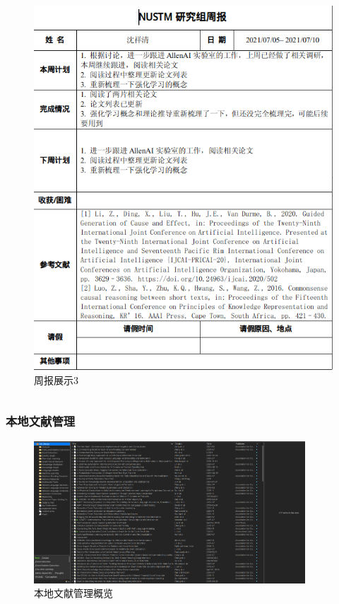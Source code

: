 \documentclass[10pt,aspectratio=43,mathserif]{beamer}
\begin{document}
\begin{frame}
\begin{columns}[b]
                \begin{figure}
                    \centering
                    \includegraphics[width=1.0\textwidth]{figures/report3.png}
                    \caption{周报展示3}
                    \label{fig:report3}
                \end{figure}

            \end{columns}

		\end{frame}
		
		\begin{frame}
		  \frametitle{\textbf{本地文献管理}}
            \begin{figure}[!t]
            \centering
            \includegraphics[width=4in]{figures/overview.png}
            \caption{本地文献管理概览}
            \label{fig:overview}
            \end{figure}
		\end{frame}
		
\end{document}
